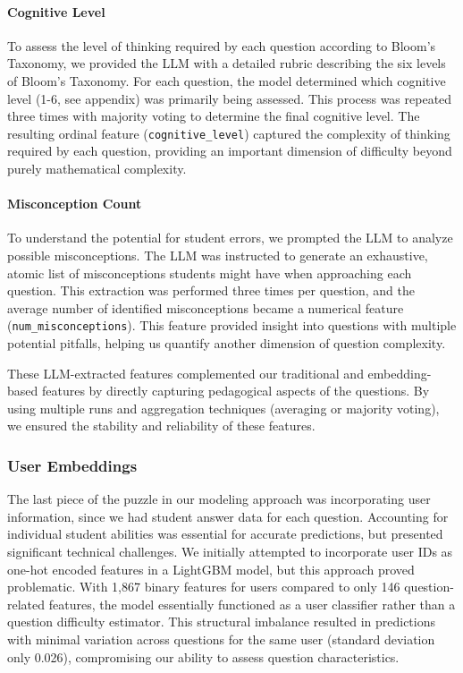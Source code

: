 \documentclass[
    a4paper, %
    10pt, %
    twoside, %
]{LTJournalArticle}
\begin{document}
\paragraph{Cognitive Level}
To assess the level of thinking required by each question according to Bloom's Taxonomy, we provided the LLM with a detailed rubric describing the six levels of Bloom's Taxonomy. For each question, the model determined which cognitive level (1-6, see appendix) was primarily being assessed. This process was repeated three times with majority voting to determine the final cognitive level. The resulting ordinal feature (\texttt{cognitive\_level}) captured the complexity of thinking required by each question, providing an important dimension of difficulty beyond purely mathematical complexity.

\paragraph{Misconception Count}
To understand the potential for student errors, we prompted the LLM to analyze possible misconceptions. The LLM was instructed to generate an exhaustive, atomic list of misconceptions students might have when approaching each question. This extraction was performed three times per question, and the average number of identified misconceptions became a numerical feature (\texttt{num\_misconceptions}). This feature provided insight into questions with multiple potential pitfalls, helping us quantify another dimension of question complexity.

These LLM-extracted features complemented our traditional and embedding-based features by directly capturing pedagogical aspects of the questions. By using multiple runs and aggregation techniques (averaging or majority voting), we ensured the stability and reliability of these features. 

\subsubsection{User Embeddings}

The last piece of the puzzle in our modeling approach was incorporating user information, since we had student answer data for each question. Accounting for individual student abilities was essential for accurate predictions, but presented significant technical challenges. We initially attempted to incorporate user IDs as one-hot encoded features in a LightGBM model, but this approach proved problematic. With 1,867 binary features for users compared to only 146 question-related features, the model essentially functioned as a user classifier rather than a question difficulty estimator. This structural imbalance resulted in predictions with minimal variation across questions for the same user (standard deviation only 0.026), compromising our ability to assess question characteristics.
\end{document}
